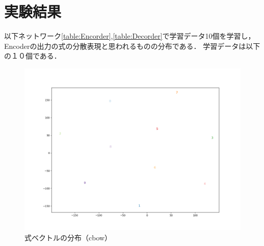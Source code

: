 \documentclass[a4j,11pt,report]{jsbook}
\begin{document}
\section{実験結果}
以下ネットワーク\ref{table:Encorder},\ref{table:Decorder}で学習データ10個を学習し，Encoderの出力の式の分散表現と思われるものの分布である．
学習データは以下の１０個である．


\begin{center}
  \begin{figure}
    \centering
    \includegraphics[width=0.8\linewidth]{image/cbow89x2.png}
    \caption{式ベクトルの分布（cbow）}
    \label{fig:formulavecter_fromCbow}
  \end{figure}
\end{center}
\end{document}
